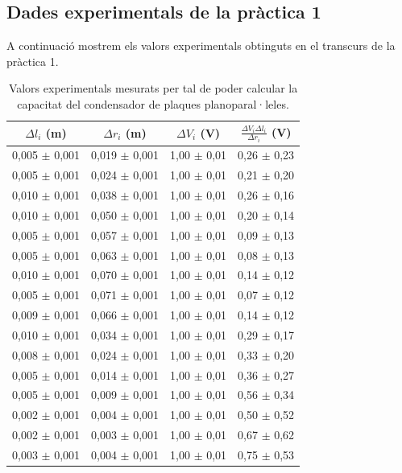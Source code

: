 \documentclass[a4paper,10.5pt]{report}
\begin{document}
\begin{appendices}
\subsection{Dades experimentals de la pràctica 1}
\label{an:a2}
A continuació mostrem els valors experimentals obtinguts en el transcurs de la pràctica 1.
\begin{table}[h]
	\centering
	\renewcommand{\arraystretch}{1.2}
	\caption{Valors experimentals mesurats per tal de poder calcular la capacitat del condensador de plaques planoparal·leles.}
	\begin{tabular}{cccc}
		\toprule
		$\Delta l_i$ (m) & $\Delta r_i$ (m) & $\Delta V_i$ (V) & $\frac{\Delta V_i\Delta l_i}{\Delta r_i}$ (V)\\
		\midrule
		0,005 $\pm$ 0,001 & 0,019 $\pm$ 0,001 & 1,00 $\pm$ 0,01 & 0,26 $\pm$ 0,23 \\
		0,005 $\pm$ 0,001 & 0,024 $\pm$ 0,001 & 1,00 $\pm$ 0,01 & 0,21 $\pm$ 0,20 \\
		0,010 $\pm$ 0,001 & 0,038 $\pm$ 0,001 & 1,00 $\pm$ 0,01 & 0,26 $\pm$ 0,16 \\
		0,010 $\pm$ 0,001 & 0,050 $\pm$ 0,001 & 1,00 $\pm$ 0,01 & 0,20 $\pm$ 0,14 \\
		0,005 $\pm$ 0,001 & 0,057 $\pm$ 0,001 & 1,00 $\pm$ 0,01 & 0,09 $\pm$ 0,13 \\
		0,005 $\pm$ 0,001 & 0,063 $\pm$ 0,001 & 1,00 $\pm$ 0,01 & 0,08 $\pm$ 0,13 \\
		0,010 $\pm$ 0,001 & 0,070 $\pm$ 0,001 & 1,00 $\pm$ 0,01 & 0,14 $\pm$ 0,12 \\
		0,005 $\pm$ 0,001 & 0,071 $\pm$ 0,001 & 1,00 $\pm$ 0,01 & 0,07 $\pm$ 0,12 \\
		0,009 $\pm$ 0,001 & 0,066 $\pm$ 0,001 & 1,00 $\pm$ 0,01 & 0,14 $\pm$ 0,12 \\
		0,010 $\pm$ 0,001 & 0,034 $\pm$ 0,001 & 1,00 $\pm$ 0,01 & 0,29 $\pm$ 0,17 \\
		0,008 $\pm$ 0,001 & 0,024 $\pm$ 0,001 & 1,00 $\pm$ 0,01 & 0,33 $\pm$ 0,20 \\
		0,005 $\pm$ 0,001 & 0,014 $\pm$ 0,001 & 1,00 $\pm$ 0,01 & 0,36 $\pm$ 0,27 \\
		0,005 $\pm$ 0,001 & 0,009 $\pm$ 0,001 & 1,00 $\pm$ 0,01 & 0,56 $\pm$ 0,34 \\
		0,002 $\pm$ 0,001 & 0,004 $\pm$ 0,001 & 1,00 $\pm$ 0,01 & 0,50 $\pm$ 0,52 \\
		0,002 $\pm$ 0,001 & 0,003 $\pm$ 0,001 & 1,00 $\pm$ 0,01 & 0,67 $\pm$ 0,62 \\
		0,003 $\pm$ 0,001 & 0,004 $\pm$ 0,001 & 1,00 $\pm$ 0,01 & 0,75 $\pm$ 0,53 \\

\end{tabular}
\end{table}
\end{appendices}
\end{document}
